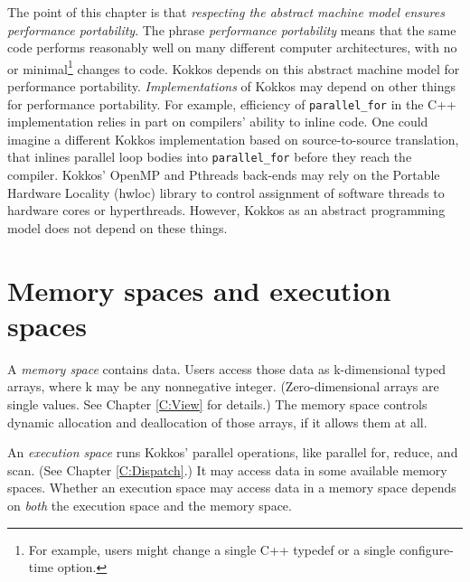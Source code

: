The point of this chapter is that \emph{respecting the abstract machine model ensures performance portability}.
The phrase \emph{performance portability} means that the same code performs reasonably well on many different computer architectures,
with no or minimal\footnote{For example, users might change a single C++ typedef or a single configure-time option.} changes to code.
Kokkos depends on this abstract machine model for performance portability.
\emph{Implementations} of Kokkos may depend on other things for performance portability.
For example, efficiency of \lstinline!parallel_for! in the C++ implementation relies in part on compilers' ability to inline code.
One could imagine a different Kokkos implementation based on source-to-source translation,
that inlines parallel loop bodies into \lstinline!parallel_for! before they reach the compiler.
Kokkos' OpenMP and Pthreads back-ends may rely on the Portable Hardware Locality (hwloc) library
to control assignment of software threads to hardware cores or hyperthreads.
However, Kokkos as an abstract programming model does not depend on these things.

\section{Memory spaces and execution spaces}\label{S:Model:Spaces}

A \emph{memory space} contains data.
Users access those data as k-dimensional typed arrays, where k may be any nonnegative integer.
(Zero-dimensional arrays are single values.  See Chapter \ref{C:View} for details.)
The memory space controls dynamic allocation and deallocation of those arrays,
if it allows them at all.

An \emph{execution space} runs Kokkos' parallel operations,
like parallel for, reduce, and scan.  (See Chapter \ref{C:Dispatch}.)
It may access data in some available memory spaces.
Whether an execution space may access data in a memory space
depends on \emph{both} the execution space and the memory space.

